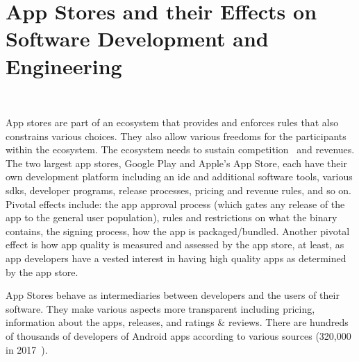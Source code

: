 

\section{App Stores and their Effects on Software Development and Engineering}~\label{rw-app-stores-and-their-effects-on-software-development-and-engineering}

App stores are part of an ecosystem that provides and enforces rules that also constrains various choices. They also allow various freedoms for the participants within the ecosystem. The ecosystem needs to sustain competition~ and revenues. The two largest app stores, Google Play and Apple's App Store, each have their own development platform including an \Gls{ide} and additional software tools, various \Glspl{sdk}, developer programs, release processes, pricing and revenue rules, and so on. 
Pivotal effects include: the app approval process (which gates any release of the app to the general user population), rules and restrictions on what the binary contains, the signing process, how the app is packaged/bundled. Another pivotal effect is how app quality is measured and assessed by the app store, at least, as app developers have a vested interest in having high quality apps as determined by the app store.

App Stores behave as intermediaries between developers and the users of their software. They make various aspects more transparent including pricing, information about the apps, releases, and ratings \& reviews. There are hundreds of thousands of developers of Android apps according to various sources (320,000 in 2017~). %

